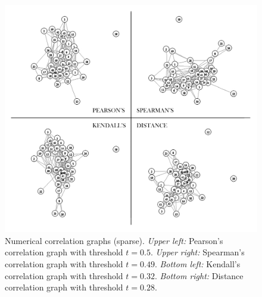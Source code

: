 \begin{figure}[htb]
	\begin{center}
		\includegraphics[width=1\linewidth]
		{ch-usage/figures/numgraphs}
		\caption[Numerical correlation graphs (sparse).]{Numerical correlation 
		graphs (sparse). \textit{Upper left:} Pearson's correlation graph with 
		threshold $t = 0.5$. \textit{Upper right:} Spearman's correlation graph 
		with threshold $t = 0.49$. \textit{Bottom left:} Kendall's correlation 
		graph with threshold $t = 0.32$. \textit{Bottom right:} Distance 
		correlation graph with threshold $t = 0.28$.}
		\label{fig:usage:numg}
	\end{center}
\end{figure}

